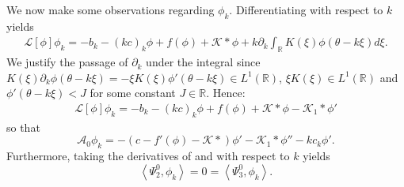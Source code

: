 \documentclass[11pt,leqno]{article}
\numberwithin{equation}{section}
\newcommand{\R}{\mathbb R}
\newcommand\LA{\left\langle}
\newcommand\RA{\right\rangle}
\theoremstyle{definition}
\begin{document}
We now make some observations regarding $\phi_k$.  Differentiating  with respect to $k$ yields
\begin{align*}
	\mathcal{L}[\phi]\phi_k = -b_k - (kc)_k\phi + f(\phi) + \mathcal{K}*\phi + k\partial_{k}\int_{\R}K(\xi)\phi(\theta - k\xi)d\xi.
\end{align*}
We justify the passage of $ \partial_{k} $ under the integral since $ K(\xi)\partial_{k}\phi(\theta - k\xi) = -\xi K(\xi)\phi'(\theta-k\xi) \in L^{1}(\R)$, $ \xi K(\xi) \in L^{1}(\R) $ and $ \phi'(\theta-k\xi) < J $ for some constant $ J \in \R $. Hence:
\begin{align*}
	\mathcal{L}[\phi]\phi_k = -b_k - (kc)_k\phi + f(\phi) + \mathcal{K}*\phi - \mathcal{K}_{1}*\phi'
\end{align*}
so that
\begin{equation}\label{e:phik_identity}
\mathcal{A}_0\phi_k = -\left(c - f'(\phi)-\mathcal{K}*\right)\phi' - \mathcal{K}_{1}*\phi'' - kc_k\phi'.
\end{equation}
Furthermore, taking the derivatives of  and  with respect to $k$ yields
\begin{equation}\label{e:phik_prods}
\LA \Psi_2^0, \phi_k\RA = 0 = \LA \Psi_3^0, \phi_k\RA.
\end{equation}
\end{document}
